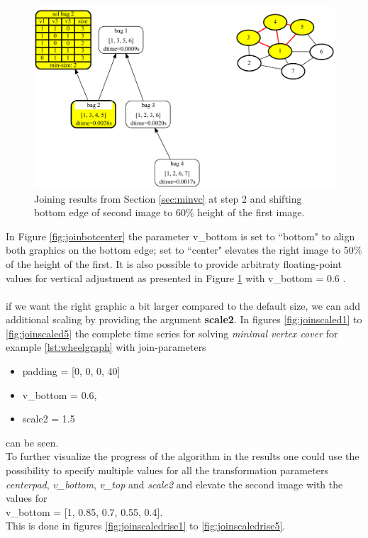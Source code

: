 \documentclass[a4paper, 12pt, bibliography=totoc]{scrartcl}
\begin{document}
\begin{figure}[H]
	\centering
	\includegraphics[width=0.9\linewidth,height=0.9\textheight,keepaspectratio]{images/SVGJOIN/default_062.pdf}
	\caption{Joining results from Section \ref{sec:minvc} at step 2 and shifting bottom edge of second image to $60\%$ height of the first image.}
	\label{fig:join60}
\end{figure}

In Figure \ref{fig:joinbotcenter} the parameter v\_bottom is set to ``bottom" to align both graphics on the bottom edge; set to ``center" elevates the right image to 50\% of the height of the first. It is also possible to provide arbitraty floating-point values for vertical adjustment as presented in Figure \ref{fig:join60} with v\_bottom = 0.6 .\\
\\
if we want the right graphic a bit larger compared to the default size, we can add additional scaling by providing the argument \textbf{scale2}. In figures \ref{fig:joinscaled1} to \ref{fig:joinscaled5} the complete time series for solving \textit{minimal vertex cover} for example \ref{lst:wheelgraph} with join-parameters
\begin{itemize}
	\item[] padding = [0, 0, 0, 40]
	\item[] v\_bottom = 0.6,
	\item[] scale2 = 1.5
\end{itemize}
can be seen. \\
To further visualize the progress of the algorithm in the results one could use the possibility to specify multiple values for all the transformation parameters \textit{centerpad}, \textit{v\_bottom}, \textit{v\_top} and \textit{scale2} and elevate the second image with the values for\\
 v\_bottom = [1, 0.85, 0.7, 0.55, 0.4]. \\
 This is done in figures \ref{fig:joinscaledrise1} to \ref{fig:joinscaledrise5}.
\end{document}
